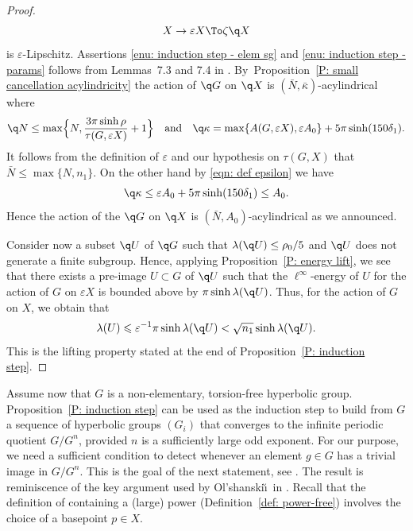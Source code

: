 \begin{proof}
\begin{equation*}
X \to \varepsilon X \To\zeta \q X
\end{equation*}
is $\varepsilon$-Lipschitz.
Assertions \eqref{enu: induction step - elem sg} and \eqref{enu: induction step - params} follows from Lemmas~7.3 and 7.4 in \cite{coulon_geometry_2014}.
By~Proposition~\ref{P: small cancellation acylindricity} the action of $\q G$ on $\q X$ is $(\bar N, \bar \kappa)$-acylindrical where
\begin{equation*}
\q N \leq \max\Bigl\{N, \frac{3\pi\sinh\rho}{\tau(G,\varepsilon X)}+1\Bigr\}
\quad \text{and} \quad
\q \kappa = \max \{A(G, \varepsilon X), \varepsilon A_0\} + 5\pi \sinh (150\delta_1).
\end{equation*}
It follows from the definition of $\varepsilon$ and our hypothesis on $\tau(G,X)$ that $\bar N \leq \max\{ N, n_1\}$.
On the other hand by \eqref{eqn: def epsilon} we have
\begin{equation*}
\q \kappa \leq \varepsilon A_0 + 5\pi \sinh (150\delta_1) \leq A_0.
\end{equation*}
Hence the action of the $\q G$ on $\q X$ is $(\bar N, A_0)$-acylindrical as we announced.

Consider now a subset $\q U$ of $\q G$ such that $\lambda(\q U) \leq \rho_0 /5$ and $\q U$ does not generate a finite subgroup.
Hence, applying Proposition~\ref{P: energy lift}, we see that there exists a pre-image $U \subset G$ of $\q U$ such that the $\ell^{\infty}$-energy of $U$ for the action of $G$ on $\varepsilon X$ is bounded above by $\pi \sinh \lambda(\q U)$.
Thus, for the action of $G$ on $X$, we obtain that
\[
\lambda (U)\leqslant \varepsilon^{-1} \pi \sinh \lambda(\q U) < \sqrt{n_1} \sinh \lambda(\q U). 
\]
This is the lifting property stated at the end of Proposition~\ref{P: induction step}.
\end{proof}

Assume now that $G$ is a non-elementary, torsion-free hyperbolic group.
Proposition~\ref{P: induction step} can be used as the induction step to build from $G$ a sequence of hyperbolic groups $(G_i)$ that converges to the infinite periodic quotient $G/G^n$, provided $n$ is a sufficiently large odd exponent.
For our purpose, we need a sufficient condition to detect whenever an element $g \in G$ has a trivial image in $G/G^n$.
This is the goal of the next statement, see \cite[Th.\,4.13]{coulon_detecting_2018}.
The result is reminiscence of the key argument used by Ol'shanski\u\i\ in \cite[\S10]{olshanskii_periodic_1991}.
Recall that the definition of containing a (large) power (Definition~\ref{def: power-free}) involves the choice of a basepoint $p \in X$.

